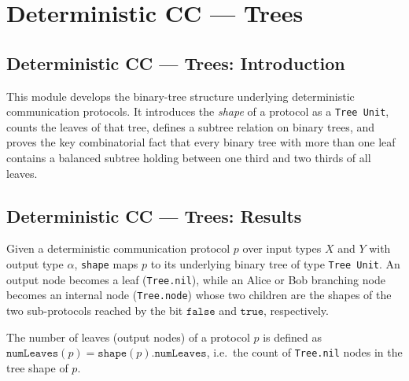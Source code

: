 \section{Deterministic CC --- Trees}
\subsection*{Deterministic CC --- Trees: Introduction}

This module develops the binary-tree structure underlying deterministic communication
protocols.  It introduces the \emph{shape} of a protocol as a \texttt{Tree Unit}, counts
the leaves of that tree, defines a subtree relation on binary trees, and proves the key
combinatorial fact that every binary tree with more than one leaf contains a balanced
subtree holding between one third and two thirds of all leaves.

\subsection*{Deterministic CC --- Trees: Results}

\begin{definition}
\label{CommunicationComplexity.Deterministic.Protocol.shape}
\leanok
{}
Given a deterministic communication protocol $p$ over input types $X$ and $Y$ with output
type $\alpha$, \texttt{shape} maps $p$ to its underlying binary tree of type
\texttt{Tree Unit}.  An output node becomes a leaf (\texttt{Tree.nil}), while an Alice or
Bob branching node becomes an internal node (\texttt{Tree.node}) whose two children are the
shapes of the two sub-protocols reached by the bit $\mathtt{false}$ and
$\mathtt{true}$, respectively.
\end{definition}

\begin{definition}
\label{CommunicationComplexity.Deterministic.Protocol.numLeaves}
\leanok
{}
The number of leaves (output nodes) of a protocol $p$ is defined as
$\texttt{numLeaves}(p) = \texttt{shape}(p).\texttt{numLeaves}$, i.e.\ the count of
\texttt{Tree.nil} nodes in the tree shape of $p$.
\end{definition}

